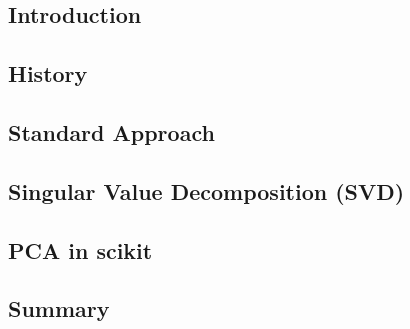 

\subsection{Introduction}


\clearpage




\subsection{History}

\clearpage




\subsection{Standard Approach} \label{section:standardApproach}

\clearpage




\subsection{Singular Value Decomposition (SVD)}

\clearpage



\subsection{PCA in scikit}

\clearpage


\subsection{Summary}

\clearpage

